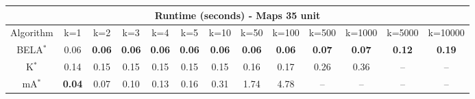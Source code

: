 \begin{tabular}{c|cccccccccccc}\toprule
\multicolumn{13}{c}{Runtime (seconds) - Maps 35 unit}\\ \midrule
Algorithm & k=1 & k=2 & k=3 & k=4 & k=5 & k=10 & k=50 & k=100 & k=500 & k=1000 & k=5000 & k=10000 \\ \midrule
BELA$^*$ & 0.06 & \textbf{0.06} & \textbf{0.06} & \textbf{0.06} & \textbf{0.06} & \textbf{0.06} & \textbf{0.06} & \textbf{0.06} & \textbf{0.07} & \textbf{0.07} & \textbf{0.12} & \textbf{0.19} \\
K$^*$ & 0.14 & 0.15 & 0.15 & 0.15 & 0.15 & 0.15 & 0.16 & 0.17 & 0.26 & 0.36 & -- & -- \\
mA$^*$ & \textbf{0.04} & 0.07 & 0.10 & 0.13 & 0.16 & 0.31 & 1.74 & 4.78 & -- & -- & -- & -- \\ \bottomrule 
\end{tabular}
